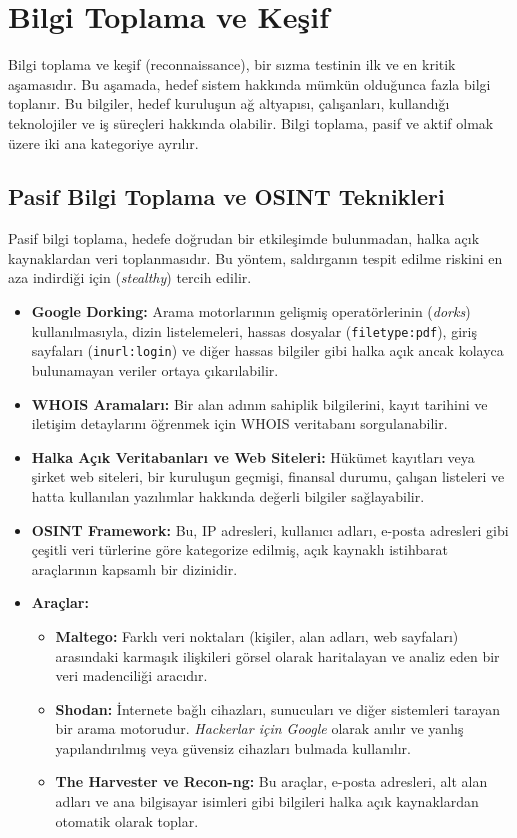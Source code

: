 \section{Bilgi Toplama ve Keşif}

Bilgi toplama ve keşif (reconnaissance), bir sızma testinin ilk ve en kritik aşamasıdır. Bu aşamada, hedef sistem hakkında mümkün olduğunca fazla bilgi toplanır. Bu bilgiler, hedef kuruluşun ağ altyapısı, çalışanları, kullandığı teknolojiler ve iş süreçleri hakkında olabilir. Bilgi toplama, pasif ve aktif olmak üzere iki ana kategoriye ayrılır.

\subsection{Pasif Bilgi Toplama ve OSINT Teknikleri}

Pasif bilgi toplama, hedefe doğrudan bir etkileşimde bulunmadan, halka açık kaynaklardan veri toplanmasıdır. Bu yöntem, saldırganın tespit edilme riskini en aza indirdiği için (\textit{stealthy}) tercih edilir.

\begin{itemize}
\item \textbf{Google Dorking:} Arama motorlarının gelişmiş operatörlerinin (\textit{dorks}) kullanılmasıyla, dizin listelemeleri, hassas dosyalar (\texttt{filetype:pdf}), giriş sayfaları (\texttt{inurl:login}) ve diğer hassas bilgiler gibi halka açık ancak kolayca bulunamayan veriler ortaya çıkarılabilir.
\item \textbf{WHOIS Aramaları:} Bir alan adının sahiplik bilgilerini, kayıt tarihini ve iletişim detaylarını öğrenmek için WHOIS veritabanı sorgulanabilir.
\item \textbf{Halka Açık Veritabanları ve Web Siteleri:} Hükümet kayıtları veya şirket web siteleri, bir kuruluşun geçmişi, finansal durumu, çalışan listeleri ve hatta kullanılan yazılımlar hakkında değerli bilgiler sağlayabilir.
\item \textbf{OSINT Framework:} Bu, IP adresleri, kullanıcı adları, e-posta adresleri gibi çeşitli veri türlerine göre kategorize edilmiş, açık kaynaklı istihbarat araçlarının kapsamlı bir dizinidir.
\item \textbf{Araçlar:}
\begin{itemize}
\item \textbf{Maltego:} Farklı veri noktaları (kişiler, alan adları, web sayfaları) arasındaki karmaşık ilişkileri görsel olarak haritalayan ve analiz eden bir veri madenciliği aracıdır.
\item \textbf{Shodan:} İnternete bağlı cihazları, sunucuları ve diğer sistemleri tarayan bir arama motorudur. \textit{Hackerlar için Google} olarak anılır ve yanlış yapılandırılmış veya güvensiz cihazları bulmada kullanılır.
\item \textbf{The Harvester ve Recon-ng:} Bu araçlar, e-posta adresleri, alt alan adları ve ana bilgisayar isimleri gibi bilgileri halka açık kaynaklardan otomatik olarak toplar.
\end{itemize}
\end{itemize}
